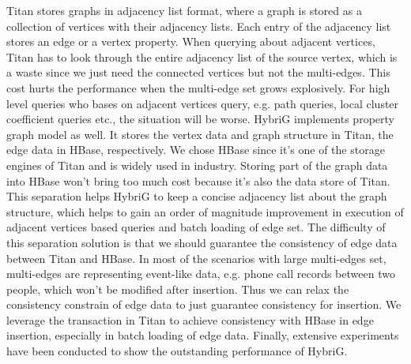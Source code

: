 \begin{eabstract}
	Titan stores graphs in adjacency list format, where a graph is stored as a collection of vertices with their adjacency lists. Each entry of the adjacency list stores an edge or a vertex property. 
	When querying about adjacent vertices, Titan has to look through the entire adjacency list of the source vertex, which is a waste since we just need the connected vertices but not the multi-edges. This cost hurts the performance when the multi-edge set grows explosively. For high level queries who bases on adjacent vertices query, e.g. path queries, local cluster coefficient queries etc., the situation will be worse. 
	HybriG implements property graph model as well. It stores the vertex data and graph structure in Titan, the edge data in HBase, respectively. We chose HBase since it’s one of the storage engines of Titan and is widely used in industry. Storing part of the graph data into HBase won’t bring too much cost because it’s also the data store of Titan.
	This separation helps HybriG to keep a concise adjacency list about the graph structure, which helps to gain an order of magnitude improvement in execution of adjacent vertices based queries and batch loading of edge set. The difficulty of this separation solution is that we should guarantee the consistency of edge data between Titan and HBase. 
	In most of the scenarios with large multi-edges set, multi-edges are representing event-like data, e.g. phone call records between two people, which won’t be modified after insertion. Thus we can relax the consistency constrain of edge data to just guarantee consistency for insertion. We leverage the transaction in Titan to achieve consistency with HBase in edge insertion, especially in batch loading of edge data. Finally, extensive experiments have been conducted to show the outstanding performance of HybriG.
\end{eabstract}

